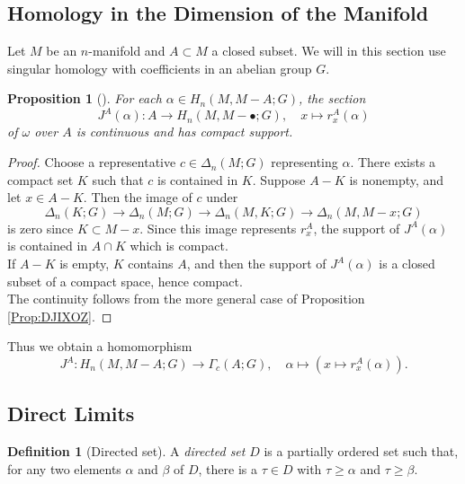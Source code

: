 \documentclass[reqno]{amsart}
\newtheorem{proposition}[theorem]{Proposition}
\theoremstyle{definition}
\newtheorem{definition}[theorem]{Definition}
\theoremstyle{remark}
\begin{document}
\subsection{Homology in the Dimension of the Manifold}

Let $M$ be an $n$-manifold and $A \subset M$ a closed subset.
We will in this section use singular homology with coefficients
in an abelian group $G$.


\begin{proposition}[]
    For each $\alpha \in H_n(M, M - A ; G)$, the
    section
    \[
    J^{A}(\alpha) \colon
    A \to H_n(M, M - \bullet; G),
    \quad x \mapsto r_x^{A} (\alpha)
    \] 
    of $\omega$ over $A$ is continuous and has
    compact support.
\end{proposition}

\begin{proof}
    Choose a representative
    $c \in \Delta_n(M;G)$ representing $\alpha$.
    There exists a compact set $K$ such that
    $c$ is contained in $K$.
    Suppose $A - K$ is nonempty, and let $x \in A - K$.
    Then the image of $c$ under
    \[
    \Delta_n (K ; G) \to 
    \Delta_n(M;G) \to \Delta_n (M,K;G) 
    \to \Delta_n (M, M - x ; G)
    \] 
    is zero since
    $K \subset M - x$. Since this image
    represents
    $r_x^{A}$, the support of $J^{A}(\alpha)$ is
    contained in $A \cap K$ which is compact.\\
    If $A - K$ is empty, $K$ contains $A$, and then
    the support of $J ^{A}(\alpha)$ is a closed
    subset of a compact space, hence compact.\\
    \linebreak
    The continuity follows from the more general case of
    Proposition \ref{Prop:DJIXOZ}.
\end{proof}

Thus we obtain a homomorphism
\[
J^{A} \colon H_n(M, M - A; G) \to 
\Gamma_c (A;G), \quad
\alpha \mapsto \left( x \mapsto r_x^{A}(\alpha) \right) .
\] 



\subsection{Direct Limits}

\begin{definition}[Directed set]
    A \textit{directed set} $D$ is a partially ordered set such that,
    for any two elements $\alpha$ and $\beta$ of $D$, there
    is a $\tau \in D$ with $\tau \ge \alpha$  and
    $\tau \ge \beta$.
\end{definition}
\end{document}
